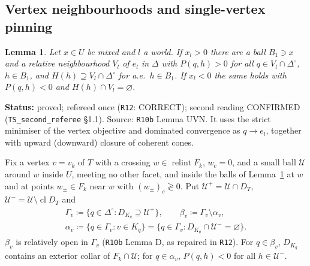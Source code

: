 \documentclass[11pt]{article}
\newtheorem{lemma}[theorem]{Lemma}
\theoremstyle{definition}
\theoremstyle{remark}
\newcommand{\Di}{\Delta^{\circ}}
\newcommand{\cl}{\operatorname{cl}}
\newcommand{\relint}{\operatorname{relint}}
\newcommand{\src}[1]{\texttt{#1}}
\newcommand{\status}[1]{\par\smallskip\noindent\textbf{Status:} #1\par\smallskip}
\begin{document}
\subsection{Vertex neighbourhoods and single-vertex pinning}

\begin{lemma}\label{lem:UVN}
Let $x\in U$ be mixed and $l$ a world. If $x_l>0$ there are a ball $B_1\ni x$ and a relative neighbourhood $V_l$ of $e_l$ in $\Delta$ with $P(q,h)>0$ for all $q\in V_l\cap\Di$, $h\in B_1$, and $H(h)\supseteq V_l\cap\Di$ for a.e.\ $h\in B_1$. If $x_l<0$ the same holds with $P(q,h)<0$ and $H(h)\cap V_l=\varnothing$.
\end{lemma}
\status{proved; refereed once (\src{R12}: CORRECT); second reading CONFIRMED (\src{TS\_second\_referee} \S1.1). Source: \src{R10b} Lemma UVN. It uses the strict minimiser of the vertex objective and dominated convergence as $q\to e_l$, together with upward (downward) closure of coherent cones.}

Fix a vertex $v=v_k$ of $T$ with a crossing $w\in\relint F_k$, $w_c=0$, and a small ball $\mathcal U$ around $w$ inside $U$, meeting no other facet, and inside the balls of Lemma~\ref{lem:UVN} at $w$ and at points $w_\pm\in F_k$ near $w$ with $(w_\pm)_c\gtrless0$. Put $\mathcal U^+=\mathcal U\cap D_T$, $\mathcal U^-=\mathcal U\setminus\cl D_T$ and
\begin{gather*}
\Gamma_v\coloneqq\{q\in\Di:D_{K_q}\supseteq\mathcal U^+\},\qquad
\beta_v\coloneqq\Gamma_v\setminus\alpha_v,\\
\alpha_v\coloneqq\{q\in\Gamma_v:v\in K_q\}=\{q\in\Gamma_v:D_{K_q}\cap\mathcal U^-=\varnothing\}.
\end{gather*}
$\beta_v$ is relatively open in $\Gamma_v$ (\src{R10b} Lemma D, as repaired in \src{R12}). For $q\in\beta_v$, $D_{K_q}$ contains an exterior collar of $F_k\cap\mathcal U$; for $q\in\alpha_v$, $P(q,h)<0$ for all $h\in\mathcal U^-$.
\end{document}
